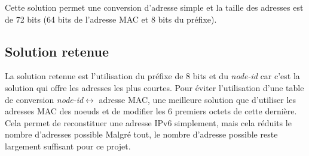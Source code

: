     Cette solution permet une conversion d'adresse simple et la taille des adresses est de 72 bits (64 bits de l'adresse MAC et 8 bits du préfixe).

\subsection*{Solution retenue}
    La solution retenue est l'utilisation du préfixe de 8 bits et du \textit{node-id} car c'est la solution qui offre les adresses les plus courtes. Pour éviter l'utilisation d'une table de conversion \textit{node-id}$\leftrightarrow$ adresse MAC, une meilleure solution que d'utiliser les adresses MAC des noeuds et de modifier les 6 premiers octets de cette dernière. Cela permet de reconstituer une adresse IPv6 simplement, mais cela réduits le nombre d'adresses possible
    Malgré tout, le nombre d'adresse possible reste largement suffisant pour ce projet.

